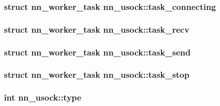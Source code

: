 \subsubsection[{task\+\_\+connecting}]{\setlength{\rightskip}{0pt plus 5cm}struct {\bf nn\+\_\+worker\+\_\+task} nn\+\_\+usock\+::task\+\_\+connecting}\hypertarget{structnn__usock_a0ae67b8a2d07fccc8857754d75dcd7f1}{}\label{structnn__usock_a0ae67b8a2d07fccc8857754d75dcd7f1}
\subsubsection[{task\+\_\+recv}]{\setlength{\rightskip}{0pt plus 5cm}struct {\bf nn\+\_\+worker\+\_\+task} nn\+\_\+usock\+::task\+\_\+recv}\hypertarget{structnn__usock_a9b638ca950a635cc49e7eb17f0b73d07}{}\label{structnn__usock_a9b638ca950a635cc49e7eb17f0b73d07}
\subsubsection[{task\+\_\+send}]{\setlength{\rightskip}{0pt plus 5cm}struct {\bf nn\+\_\+worker\+\_\+task} nn\+\_\+usock\+::task\+\_\+send}\hypertarget{structnn__usock_a5db90aa2055ddefeae86903bf1df35d3}{}\label{structnn__usock_a5db90aa2055ddefeae86903bf1df35d3}
\subsubsection[{task\+\_\+stop}]{\setlength{\rightskip}{0pt plus 5cm}struct {\bf nn\+\_\+worker\+\_\+task} nn\+\_\+usock\+::task\+\_\+stop}\hypertarget{structnn__usock_ade4ecaabd4210ac86a29d61cfbf346bc}{}\label{structnn__usock_ade4ecaabd4210ac86a29d61cfbf346bc}
\subsubsection[{type}]{\setlength{\rightskip}{0pt plus 5cm}int nn\+\_\+usock\+::type}\hypertarget{structnn__usock_ac2de5c69882ca0041b210aaf57cdcebd}{}\label{structnn__usock_ac2de5c69882ca0041b210aaf57cdcebd}

